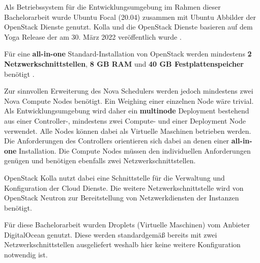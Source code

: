 \documentclass[../Main.tex]{subfiles}
\begin{document}
Als Betriebssystem für die Entwicklungsumgebung im Rahmen dieser Bachelorarbeit wurde Ubuntu Focal (20.04) zusammen mit Ubuntu Abbilder
der OpenStack Dienste genutzt. Kolla und die OpenStack Dienste basieren auf dem Yoga Release der am 30. März 2022 veröffentlich wurde \citep{OpenstackYogaRelease}.

Für eine \textbf{all-in-one} Standard-Installation von OpenStack werden mindestens \textbf{2 Netzwerkschnittstellen},
\textbf{8 GB RAM} und \textbf{40 GB Festplattenspeicher} benötigt \citep{KollaQuickStart}.

Zur sinnvollen Erweiterung des Nova Schedulers werden jedoch mindestens zwei Nova Compute Nodes benötigt.
Ein Weighing einer einzelnen Node wäre trivial. Als Entwicklungsumgebung wird daher ein \textbf{multinode}
Deployment bestehend aus einer Controller-, mindestens zwei Compute- und einer Deployment Node verwendet.
Alle Nodes können dabei als Virtuelle Maschinen betrieben werden. Die Anforderungen des Controllers orientieren
sich dabei an denen einer \textbf{all-in-one} Installation. Die Compute Nodes müssen den individuellen Anforderungen
genügen und benötigen ebenfalls zwei Netzwerkschnittstellen.

OpenStack Kolla nutzt dabei eine Schnittstelle für die Verwaltung und Konfiguration der Cloud Dienste.
Die weitere Netzwerkschnittstelle wird von OpenStack Neutron zur Bereitstellung von Netzwerkdiensten der Instanzen benötigt.

Für diese Bachelorarbeit wurden Droplets (Virtuelle Maschinen) vom Anbieter DigitalOcean genutzt. Diese
werden standardgemä{\ss} bereits mit zwei Netzwerkschnittstellen ausgeliefert weshalb hier keine weitere
Konfiguration notwendig ist.

\biblio %
\end{document}

